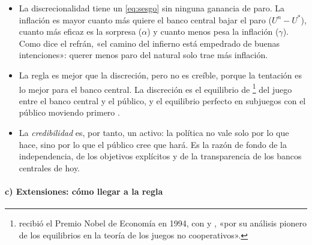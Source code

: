 \documentclass[11pt]{article}
\begin{document}
\begin{itemize}
\item La discrecionalidad tiene un  \eqref{eq:sesgo} sin ninguna ganancia de paro. La inflación es mayor cuanto más quiere el banco central bajar el paro ($U^n-U^*$), cuanto más eficaz es la sorpresa ($\alpha$) y cuanto menos pesa la inflación ($\gamma$). Como dice el refrán, «el camino del infierno está empedrado de buenas intenciones»: querer menos paro del natural solo trae más inflación.
\item La regla es mejor que la discreción, pero no es creíble, porque la tentación es lo mejor para el banco central. La discreción es el equilibrio de \footnote{ recibió el Premio Nobel de Economía en 1994, con  y , «por su análisis pionero de los equilibrios en la teoría de los juegos no cooperativos»\nocite{Nobel1994Nash}.} del juego entre el banco central y el público, y el equilibrio perfecto en subjuegos con el público moviendo primero .
\item La \emph{credibilidad} es, por tanto, un activo: la política no vale solo por lo que hace, sino por lo que el público cree que hará. Es la razón de fondo de la independencia, de los objetivos explícitos y de la transparencia de los bancos centrales de hoy.
\end{itemize}

\paragraph{c) Extensiones: cómo llegar a la regla}
\end{document}

